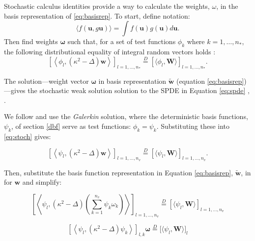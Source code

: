 Stochastic calculus identities provide a way to calculate the weights, $\omega$, in the basis representation of \ref{eq:basisrep}. To start, define notation: $$\langle f(\pmb{u}, g\pmb{u}) \rangle = \int f(\pmb{u}) g(\pmb{u}) d\pmb{u}.$$ 
Then find weights $\pmb{\omega}$ such that, for a set of test functions $\phi_{k}$ where $k = 1, \dots, n_{*}$, the following distributional equality of integral random vectors holds \citep{Lindgren2011}:
\begin{equation}  \label{eq:stoch} %
\left[ \left< \phi_{l}, (\kappa^{2} - \Delta) \pmb{w} \right> \right]_{l = 1, \hdots, n_{*}} 
\overset{D}{=}
\left[ \langle \phi_{l}, \pmb{W} \rangle \right]_{l = 1, \hdots, n_{*}}.
\end{equation}

The solution---weight vector $\pmb{\omega}$ in basis representation $\widetilde{\pmb{w}}$ (equation \ref{eq:basisrep})---gives the stochastic weak solution solution to the SPDE in Equation \ref{eq:spde} \citep{Mao2007}, \citep{Lindstrom2014}. 

We follow \cite{Lindgren2011} and use the {\it Galerkin} solution, where the deterministic basis functions, $\psi_{k}$,  of section \ref{dbf} serve as test functions: $\phi_{k} = \psi_{k}$. Substituting these into \ref{eq:stoch} gives:

\begin{equation} \label{eq:stoch2} %
\left[ \left< \psi_{l}, (\kappa^{2} - \Delta) \pmb{w} \right> \right]_{l = 1, \hdots, n_{v}} 
\overset{D}{=}
\left[ \langle \psi_{l}, \pmb{W} \rangle \right]_{l = 1, \hdots, n_{v}}.
\end{equation}

Then, substitute the basis function representation in Equation \ref{eq:basisrep}, $\widetilde{\pmb{w}}$, in for $\pmb{w}$ and simplify:


$$ \left[ \left< \psi_{l}, (\kappa^{2} - \Delta) \left( \sum_{k=1}^{n_{v}} \psi_{k}\omega_{k} \right) \right> \right]_{l = 1, \hdots, n_{v}} 
\overset{D}{=}
\left[ \langle \psi_{l}, \pmb{W} \rangle \right]_{l = 1, \hdots, n_{v}} $$

$$ \left[ \left< \psi_{l}, (\kappa^{2} - \Delta) \psi_{k} \right> \right]_{l,k} \pmb{\omega} 
\overset{D}{=} 
\Big[ \langle \psi_{l}, \pmb{W} \rangle \Big]_{l} $$ 

